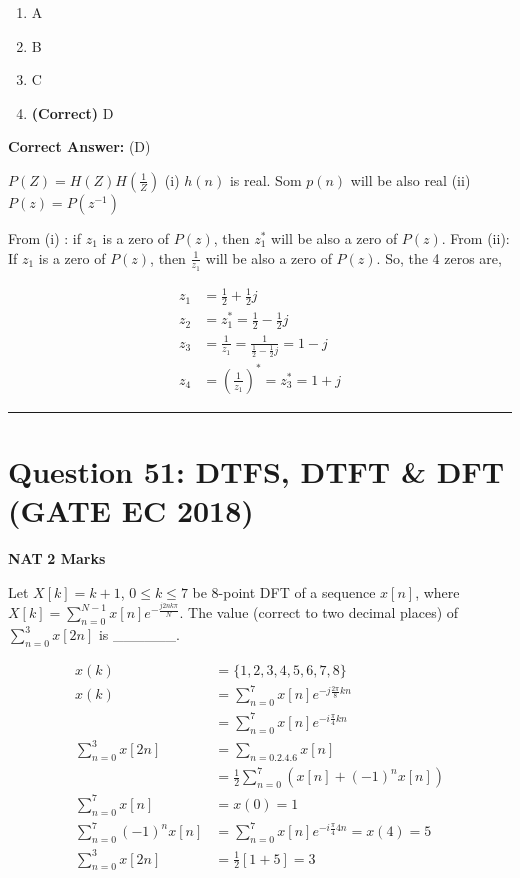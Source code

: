 \documentclass[11pt,a4paper]{article}
\begin{document}
\begin{enumerate}[label=(\Alph*)]
    \item A
    \item B
    \item C
    \item \textbf{(Correct)} D
\end{enumerate}

\noindent \textbf{Correct Answer:} (D)

\begin{tcolorbox}[solbox, title=Detailed Solution -- Question 50]
$P(Z)=H(Z)H\left ( \frac{1}{Z} \right )$
 (i) $h(n)$ is real. Som $p(n)$ will be also real
(ii) $P(z)=P(z^{-1})$

 From (i) : if $z_1$ is a zero of $P(z)$, then $z_1^*$ will be also a zero of $P(z)$.
From (ii): If $z_1$ is a zero of $P(z)$, then $\frac{1}{z_1}$ will be also a zero of $P(z)$.
So, the 4 zeros are,

\[
\begin{aligned} z_1&= \frac{1}{2}+\frac{1}{2}j\\ z_2&= z_1^*=\frac{1}{2}-\frac{1}{2}j\\ z_3&=\frac{1}{z_1}=\frac{1}{\frac{1}{2}-\frac{1}{2}j}=1-j \\ z_4&=\left ( \frac{1}{z_1} \right )^*=z_3^*=1+j \end{aligned}
\]
\end{tcolorbox}

\vspace{1.5em}
\hrule
\vspace{1.5em}

\section*{Question 51: DTFS, DTFT \& DFT (GATE EC 2018)}
\noindent \textbf{\color{primary}NAT} \hfill \textbf{\color{secondary}2 Marks}


\noindent Let $X[k]=k+1$, $0\leq k \leq 7$ be 8-point DFT of a sequence $x[n]$, 
where $X[k]=  \sum_{n=0}^{N-1} x[n]e^{-\frac{j2nk\pi }{N}}$.
  The value (correct to two decimal places) of $\sum_{n=0}^{3}x[2n]$  is \_\_\_\_\_\_.


\begin{tcolorbox}[solbox, title=Detailed Solution -- Question 51]
\[
\begin{aligned} x(k) &=\{1,2,3,4,5,6,7,8\} \\ x(k) &=\sum_{n=0}^{7} x[n] e^{-j \frac{2 \pi}{8} k n} \\ &=\sum_{n=0}^{7} x[n] e^{-i \frac{\pi}{4} k n} \\ \sum_{n=0}^{3} x[2 n] &=\sum_{n=0.2 .4 .6} x[n] \\ &=\frac{1}{2} \sum_{n=0}^{7}\left(x[n]+(-1)^{n} x[n]\right) \\ \sum_{n=0}^{7} x[n] &=x(0)=1 \\ \sum_{n=0}^{7}(-1)^{n} x[n] &=\sum_{n=0}^{7} x[n] e^{-i \frac{\pi}{4} 4 n}=x(4)=5 \\ \sum_{n=0}^{3} x[2 n] &=\frac{1}{2}[1+5]=3 \end{aligned}
\]
\end{tcolorbox}
\end{document}
